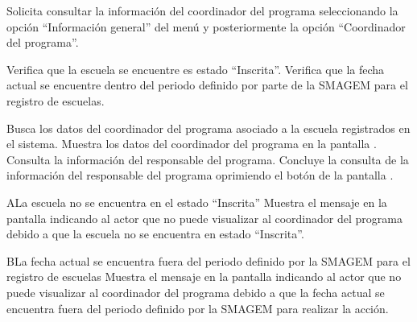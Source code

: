   \begin{UCtrayectoria}
      \UCpaso[\UCactor] Solicita consultar la información del coordinador del programa seleccionando la opción ``Información general'' del menú  y posteriormente la opción ``Coordinador del programa''. 
      
    \UCpaso[\UCsist] Verifica que la escuela se encuentre es estado ``Inscrita''. 
    \UCpaso[\UCsist] Verifica que la fecha actual se encuentre dentro del periodo definido por parte de la SMAGEM para el registro de escuelas.             
      
    \UCpaso[\UCsist] Busca los datos del coordinador del programa asociado a la escuela registrados en el sistema. 
    \UCpaso[\UCsist] Muestra los datos del coordinador del programa en la pantalla .
     \UCpaso[\UCactor] Consulta la información del responsable del programa.
    \UCpaso[\UCactor] Concluye la consulta de la información del responsable del programa oprimiendo el botón  de la pantalla .
 \end{UCtrayectoria}
 
 
  \begin{UCtrayectoriaA}{A}{La escuela no se encuentra en el estado ``Inscrita''}
    \UCpaso[\UCsist] Muestra el mensaje  en la pantalla  indicando al actor que no puede visualizar al coordinador del programa debido a que la escuela no se encuentra en estado ``Inscrita''.
 \end{UCtrayectoriaA}

 \begin{UCtrayectoriaA}{B}{La fecha actual se encuentra fuera del periodo definido por la SMAGEM para el registro de escuelas}
    \UCpaso[\UCsist] Muestra el mensaje  en la pantalla  indicando al actor que no puede visualizar al coordinador del programa debido a que la fecha actual se encuentra fuera del periodo definido por la SMAGEM para realizar la acción.
 \end{UCtrayectoriaA}
 
 